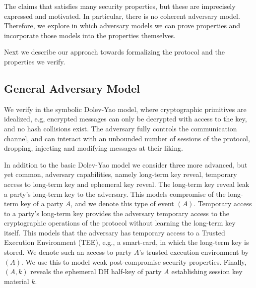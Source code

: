 The \mEdhoc{} \mSpec{} \cite{selander-lake-edhoc-01} claims
that \mEdhoc{} satisfies many security properties, but these are imprecisely
expressed and motivated.
%
In particular, there is no coherent adversary model.
%
Therefore, we explore in which adversary models we can prove properties and
incorporate those models into the properties themselves.
%

Next we describe our approach towards formalizing the \mEdhoc{} protocol and the
properties we verify.
%

\subsection{General Adversary Model}\label{sec:threat-model}
We verify \mEdhoc{} in the symbolic Dolev-Yao model, where
cryptographic primitives are idealized, e.g, encrypted messages can only be
decrypted with access to the key, and no hash collisions exist.
%
The adversary fully controls the
communication channel, and can interact with an unbounded number of sessions
of the protocol, dropping, injecting and modifying messages at their liking.
%

In addition to the basic Dolev-Yao model we consider three more advanced, but
yet common, adversary capabilities, namely long-term key reveal, temporary
access to long-term key and ephemeral key reveal.
%
The long-term key reveal leak a party's long-term key to the adversary.
%
This models compromise of the long-term key of a party $A$, and we denote this
type of event \mRevLTK$(A)$.
%
Temporary access to a party's long-term key provides the adversary temporary
access to the cryptographic operations of the protocol without learning the
long-term key itself.
%
This models that the adversary has temporary access to a Trusted Execution
Environment (TEE), e.g., a smart-card, in which the long-term key is stored.
%
We denote such an access to party $A$'s trusted execution environment by
\mTEE$(A)$.
%
We use this to model weak post-compromise security properties.
%
Finally, \mRevEph$(A, k)$ reveals the ephemeral DH half-key of party $A$
establishing session key material $k$.
%
